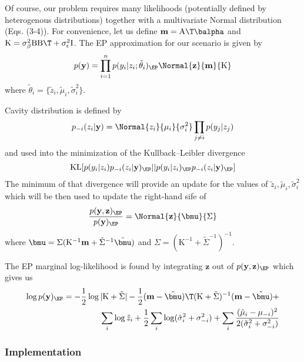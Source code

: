 Of course, our problem requires many likelihoods (potentially defined by heterogenous distributions) together with a multivariate Normal distribution (Eqs. (3-4)). For convenience, let us define $\mathbf m = \mathrm A\T \balpha$ and $\mathrm K = \sigma^2_{\beta} \mathrm B\mathrm B\T + \sigma^2_{\epsilon} \mathrm I$. The EP approximation for our scenario is given by
\begin{align*}
p(\mathbf y) = \prod_{i=1}^n p(y_i|z_i; \tilde \theta_i)_{\EP} \Normal{\mathbf z}{\mathbf m}{\mathrm K}
\end{align*}
where $\tilde \theta_i = \{\tilde z_i, \tilde \mu_i, \tilde \sigma^2_i\}$.

Cavity distribution is defined by
\begin{align*}
p_{-i}(z_i|\mathbf y) = \Normal{z_i}{\mu_i}{\sigma^2_i} \prod_{j\neq i} p(y_j|z_j)
\end{align*}
and used into the minimization of the Kullback–Leibler divergence
\begin{align*}
\mathrm{KL}[ p(y_i|z_i) p_{-i}(z_i | \mathbf y)_{\EP} || p(y_i|z_i)_{\EP} p_{-i}(z_i | \mathbf y)_{\EP}]
\end{align*}
The minimum of that divergence will provide an update for the values of $\tilde z_i, \tilde\mu_i, \tilde\sigma^2_i$ which will be then used to update the right-hand sife of
\begin{align*}
\frac{p(\mathbf y, \mathbf z)_{\EP}}{p(\mathbf y)_{\EP}} = \Normal{\mathbf z}{\bmu}{\Sigma}
\end{align*}
where $\bmu = \Sigma(\mathrm K^{-1} \mathbf m + \tilde\Sigma^{-1}\tilde\bmu)$ and $\Sigma=(\mathrm K^{-1} + \tilde\Sigma^{-1})^{-1}$.

The EP marginal log-likelihood is found by integrating $\mathbf z$ out of $p(\mathbf y, \mathbf z)_{\EP}$ which gives us
\begin{align*}
\log p(\mathbf y)_{\EP} = -\frac{1}{2} \log |\mathrm K + \tilde \Sigma| - \frac{1}{2} (\mathbf m - \tilde\bmu)\T(\mathrm K + \tilde\Sigma)^{-1}(\mathbf m - \tilde\bmu) +\\
\sum_i \log \hat z_i + \frac{1}{2} \sum_i \log(\tilde \sigma_i^2 + \sigma_{-i}^2) + \sum_i \frac{(\tilde \mu_i - \mu_{-i})^2}{2(\tilde \sigma_i^2 + \sigma_{-i}^2)}
\end{align*}

\subsubsection{Implementation}

